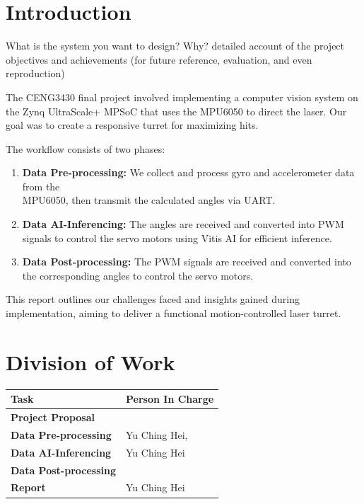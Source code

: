 \documentclass[12pt, a4paper]{article}
\begin{document}
\tableofcontents

\section{Introduction}
What is the system you want to design? Why?
detailed account of the project objectives
and achievements (for future reference, evaluation, and even
reproduction)

The CENG3430 final project involved implementing a computer vision system on the Zynq UltraScale+ MPSoC \cite{zynq_ultrascale_swdev}
that uses the MPU6050 to direct the laser. Our goal was to create a responsive turret for maximizing hits.

\noindent The workflow consists of two phases:
\begin{enumerate}
    \item \textbf{Data Pre-processing:} We collect and process gyro and accelerometer 
          data from the \\MPU6050, then transmit the calculated angles via UART.
    \item \textbf{Data AI-Inferencing:} The angles are received and converted into PWM 
          signals to control the servo motors using Vitis AI \cite{vitis_ai_docs} for efficient inference.
    \item \textbf{Data Post-processing:} The PWM signals are received and converted into 
          the corresponding angles to control the servo motors.
\end{enumerate}
This report outlines our challenges faced and insights gained during implementation, aiming to deliver a functional motion-controlled laser turret.

\section{Division of Work}
\begin{tabularx}{\textwidth}{|l||X|}
    \hline
    \textbf{Task} & \textbf{Person In Charge} \\
    \hline\hline
    \textbf{Project Proposal} &  \\
    \hline
    \textbf{Data Pre-processing} & Yu Ching Hei,  \\
    \hline
    \textbf{Data AI-Inferencing} & Yu Ching Hei \\
    \hline
    \textbf{Data Post-processing} &  \\
    \hline
    \textbf{Report} & Yu Ching Hei \\
    \hline
\end{tabularx}
\end{document}
